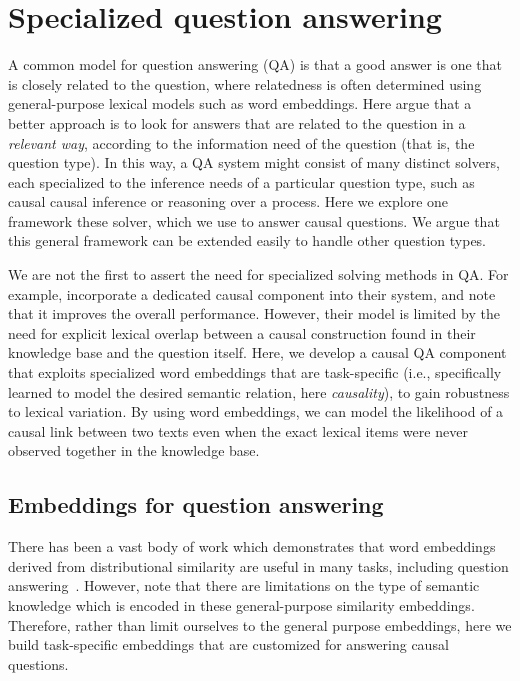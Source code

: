 \section{Specialized question answering}

A common model for question answering (QA) is that a good answer is one that is closely related to the question, where relatedness is often determined using general-purpose lexical models such as word embeddings. 
Here argue that a better approach is to look for answers that are related to the question in a {\em relevant way}, according to the information need of the question (that is, the question type).
In this way, a QA system might consist of many distinct solvers, each specialized to the inference needs of a particular question type, such as causal causal inference or reasoning over a process.  Here we explore one framework these solver, which we use to answer causal questions.  We argue that this general framework can be extended easily to handle other question types.

We are not the first to assert the need for specialized solving methods in QA.  For example, \citet{oh2013question} incorporate a dedicated causal component into their system, and note that it improves the overall performance.  However, their model is limited by the need for explicit lexical overlap between a causal construction found in their knowledge base and the question itself.  Here, we develop a causal QA component that exploits specialized word embeddings that are task-specific (i.e., specifically learned to model the desired semantic relation, here \textit{causality}), to gain robustness to lexical variation.  
By using word embeddings, we can model the likelihood of a causal link between two texts even when the exact lexical items were never observed together in the knowledge base.

\subsection{Embeddings for question answering}
There has been a vast body of work which demonstrates that word embeddings derived from distributional similarity are useful in many tasks, including question answering~\mbox{\citep[see \emph{inter alia}][]{fried2015higher,yih13}}.  However, \citet{levy2015supervised} note that there are limitations on the type of semantic knowledge which is encoded in these general-purpose similarity embeddings.  Therefore, rather than limit ourselves to the general purpose embeddings, here we build task-specific embeddings that are customized for answering causal questions.

